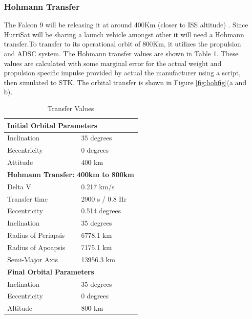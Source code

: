 \subsubsection{Hohmann Transfer}
The Falcon 9 will be releasing it at around 400Km (closer to ISS altitude) \cite{NASA2017}. Since HurriSat will be sharing a launch vehicle amongst other it will need a Hohmann transfer.To transfer to its operational orbit of 800Km, it utilizes the propulsion and ADSC system. The Hohmann transfer values are shown in Table \ref{Tab:hoh}. These values are calculated with some marginal error for the actual weight and propulsion specific impulse provided by actual the manufacturer using a script, then simulated to STK. The orbital transfer is shown in Figure \ref{fig:hohfig}(a and b). \\
\FloatBarrier
\begin{table}[hbt!]
\centering
\caption{Transfer Values}
\begin{tabular}{ll}
\multicolumn{2}{l}{\cellcolor[HTML]{C0C0C0}\textbf{Initial Orbital Parameters}}       \\ \hline
Inclination         & 35 degrees      \\
Eccentricity        & 0 degrees       \\
Attitude            & 400 km          \\
\multicolumn{2}{l}{\cellcolor[HTML]{C0C0C0}\textbf{Hohmann Transfer: 400km to 800km}} \\ \hline
Delta V             & 0.217 km/s      \\
Transfer time       & 2900 s / 0.8 Hr \\
Eccentricity        & 0.514 degrees   \\
Inclination         & 35 degrees      \\
Radius of Periapsis & 6778.1 km       \\
Radius of Apoapsis  & 7175.1 km       \\
Semi-Major Axis     & 13956.3 km      \\
\multicolumn{2}{l}{\cellcolor[HTML]{C0C0C0}\textbf{Final Orbital Parameters}}         \\ \hline
Inclination         & 35 degrees      \\
Eccentricity        & 0 degrees       \\
Altitude            & 800 km         
\end{tabular}
\label{Tab:hoh}
\end{table}
\\
